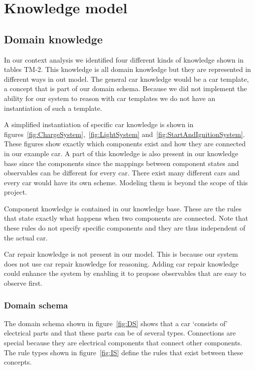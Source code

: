 \section{Knowledge model}


\subsection{Domain knowledge}
In our context analysis we identified four different kinds of knowledge shown in tables TM-2. This knowledge is all domain knowledge but they are represented in different ways in out model. The general car knowledge would be a car template, a concept that is part of our domain schema. Because we did not implement the ability for our system to reason with car templates we do not have an instantiation of such a template.

A simplified instantiation of specific car knowledge is shown in figures~\ref{fig:ChargeSystem},~\ref{fig:LightSystem} and~\ref{fig:StartAndIgnitionSystem}. These figures show exactly which components exist and how they are connected in our example car. A part of this knowledge is also present in our knowledge base since the components since the mappings between component states and observables can be different for every car. There exist many different cars and every car would have its own scheme. Modeling them is beyond the scope of this project.

Component knowledge is contained in our knowledge base. These are the rules that state exactly what happens when two components are connected. Note that these rules do not specify specific components and they are thus independent of the actual car.

Car repair knowledge is not present in our model. This is because our system does not use car repair knowledge for reasoning. Adding car repair knowledge could enhance the system by enabling it to propose observables that are easy to observe first.

\subsubsection{Domain schema}
The domain schema shown in figure~\ref{fig:DS} shows that a car `consists of' electrical parts and that these parts can be of several types. Connections are special because they are electrical components that connect other components. The rule types shown in figure~\ref{fig:IS} define the rules that exist between these concepts. 


